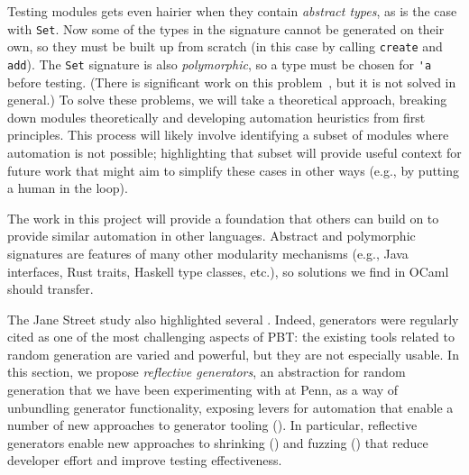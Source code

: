 Testing modules gets even hairier when they contain {\em abstract types}, as is
the case with \lstinline{Set}. Now some of the types in the signature cannot be
generated on their own, so they must be built up from scratch (in this case by
calling \lstinline{create} and \lstinline{add}). The \lstinline{Set} signature is
also {\em polymorphic}, so a type must be chosen for \lstinline{'a} before
testing. (There is significant work on this
problem~\cite{hou_favonia_logarithm_2022}, but it is not solved in general.)
To solve these problems, we will take a theoretical approach, breaking down
modules theoretically and developing automation heuristics from first
principles. This process will likely involve identifying a subset of
modules where automation is not possible; highlighting that subset will
provide useful context for future work that might aim to simplify these cases in
other ways (e.g., by putting a human in the loop).

The work in this project will provide a foundation that others can build on to
provide similar automation in other languages. Abstract and polymorphic
signatures are features of many other modularity mechanisms (e.g., Java
interfaces, Rust traits, Haskell type classes, etc.), so solutions we find in
OCaml should transfer.

%
The Jane Street study also highlighted several .
Indeed, generators were regularly cited as one of the most challenging
aspects of PBT: the existing tools related to random generation are varied
and powerful, but
they are not especially usable.  In this section, we propose {\em reflective
generators}, an abstraction for random generation that we have been
experimenting with at Penn, as a way of unbundling generator
functionality, exposing levers for
automation that enable a number of new approaches to generator
tooling (). In particular, reflective
generators enable new
approaches to shrinking () and fuzzing
() that reduce developer effort and improve testing
effectiveness.

